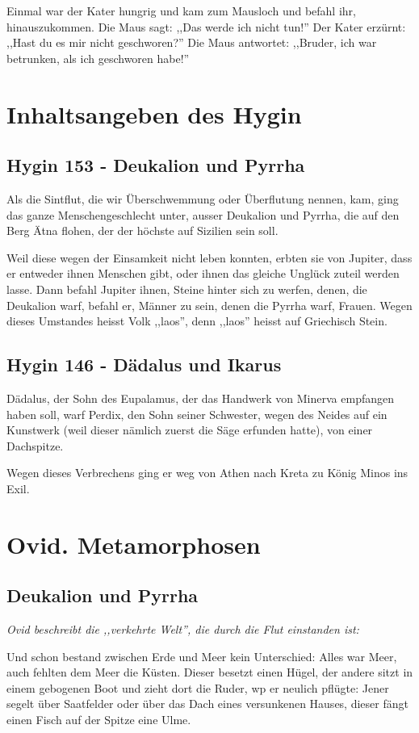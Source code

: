 \documentclass[a4paper]{article}
\begin{document}
Einmal war der Kater hungrig und kam zum Mausloch und befahl ihr, hinauszukommen. Die Maus sagt: ,,Das werde ich nicht tun!'' Der Kater erzürnt: ,,Hast du es mir nicht geschworen?'' Die Maus antwortet: ,,Bruder, ich war betrunken, als ich geschworen habe!''

\section{Inhaltsangeben des Hygin}
\subsection{Hygin 153 - Deukalion und Pyrrha}
Als die Sintflut, die wir Überschwemmung oder Überflutung nennen, kam, ging das ganze Menschengeschlecht unter, ausser Deukalion und Pyrrha, die auf den Berg Ätna flohen, der der höchste auf Sizilien sein soll.

Weil diese wegen der Einsamkeit nicht leben konnten, erbten sie von Jupiter, dass er entweder ihnen Menschen gibt, oder ihnen das gleiche Unglück zuteil werden lasse. Dann befahl Jupiter ihnen, Steine hinter sich zu werfen, denen, die Deukalion warf, befahl er, Männer zu sein, denen die Pyrrha warf, Frauen. Wegen dieses Umstandes heisst Volk ,,laos'', denn ,,laos'' heisst auf Griechisch Stein. 
\subsection{Hygin 146 - Dädalus und Ikarus}
Dädalus, der Sohn des Eupalamus, der das Handwerk von Minerva empfangen haben soll, warf Perdix, den Sohn seiner Schwester, wegen des Neides auf ein Kunstwerk (weil dieser nämlich zuerst die Säge erfunden hatte), von einer Dachspitze. 

Wegen dieses Verbrechens ging er weg von Athen nach Kreta zu König Minos ins Exil.

\section{Ovid. Metamorphosen}
\subsection{Deukalion und Pyrrha}
\textit{Ovid beschreibt die ,,verkehrte Welt'', die durch die Flut einstanden ist: }

Und schon bestand zwischen Erde und Meer kein Unterschied: Alles war Meer, auch fehlten dem Meer die Küsten. Dieser besetzt einen Hügel, der andere sitzt in einem gebogenen Boot und zieht dort die Ruder, wp er neulich pflügte: Jener segelt über Saatfelder oder über das Dach eines versunkenen Hauses, dieser fängt einen Fisch auf der Spitze eine Ulme. 
\end{document}
